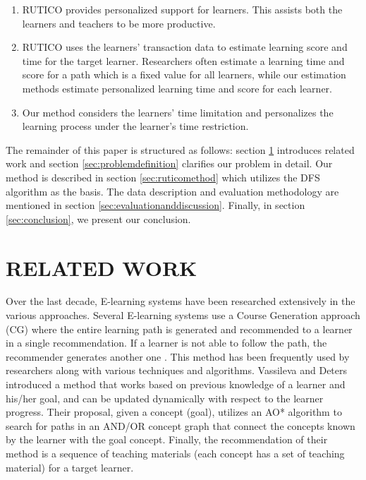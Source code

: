\documentclass{sig-alternate}
\begin{document}
\begin{enumerate}[noitemsep,label=(\arabic*)]
\item RUTICO provides personalized support for learners. This assists both the learners and teachers to be more productive.
\item RUTICO uses the learners’ transaction data to estimate learning score and time for the target learner. Researchers often estimate a learning time and score for a path which is a fixed value for all learners, while our estimation methods estimate personalized learning time and score for each learner.
\item Our method considers the learners’ time limitation and personalizes the learning process under the learner’s time restriction.
\end{enumerate}

The remainder of this paper is structured as follows: section \ref{sec:relatedwork} introduces related work and section \ref{sec:problemdefinition} clarifies our problem in detail. Our method is described in section \ref{sec:ruticomethod} which utilizes the DFS algorithm as the basis. The data description and evaluation methodology are mentioned in section \ref{sec:evaluationanddiscussion}. Finally, in section \ref{sec:conclusion}, we present our conclusion.
\newpage
\section{RELATED WORK}
\label{sec:relatedwork}
\noindent Over the last decade, E-learning systems have been researched extensively in the various approaches. Several E-learning systems use a Course Generation approach (CG) where the entire learning path is generated and recommended to a learner in a single recommendation. If a learner is not able to follow the path, the recommender generates another one \cite{belacel2014binary,durand2013graph,ullrich2010complex}. This method has been frequently used by researchers along with various techniques and algorithms. Vassileva and Deters \cite{vassileva1998dynamic} introduced a method that works based on previous knowledge of a learner and his/her goal, and can be updated dynamically with respect to the learner progress. Their proposal, given a concept (goal), utilizes an AO* algorithm \cite{bundy1986catalogue} to search for paths in an AND/OR concept graph \cite{de1990and} that connect the concepts known by the learner with the goal concept. Finally, the recommendation of their method is a sequence of teaching materials (each concept has a set of teaching material) for a target learner.
\end{document}
